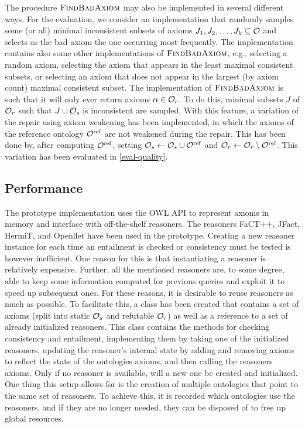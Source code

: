 The procedure $\textsc{FindBadAxiom}$ may also be implemented in several different ways. For the evaluation, we consider an implementation that randomly samples some (or all) minimal inconsistent subsets of axioms $J_1, J_2, \dots, J_k \subseteq \mathcal{O}$ and selects as the bad axiom the one occurring most frequently. The implementation contains also some other implementations of $\textsc{FindBadAxiom}$, e.g., selecting a random axiom, selecting the axiom that appears in the least maximal consistent subsets, or selecting an axiom that does not appear in the largest (by axiom count) maximal consistent subset. The implementation of $\textsc{FindBadAxiom}$ is such that it will only ever return axioms $\alpha \in \mathcal{O}_r$. To do this, minimal subsets $J$ of $\mathcal{O}_r$ such that $J \cup \mathcal{O}_s$ is inconsistent are sampled. With this feature, a variation of the repair using axiom weakening has been implemented, in which the axioms of the reference ontology ${\mathcal{O}^\textnormal{ref}}$ are not weakened during the repair. This has been done by, after computing ${\mathcal{O}^\textnormal{ref}}$, setting $\mathcal{O}_s \gets \mathcal{O}_s \cup {\mathcal{O}^\textnormal{ref}}$ and $\mathcal{O}_r \gets \mathcal{O}_r \setminus {\mathcal{O}^\textnormal{ref}}$. This variation has been evaluated in \cref{eval-quality}.

\subsection{Performance}\label{performance-impl}

The prototype implementation uses the OWL API \cite{horridge2011owl,owlapi} to represent axioms in memory and interface with off-the-shelf reasoners. The reasoners FaCT++, JFact, HermiT, and Openllet have been used in the prototype. Creating a new reasoner instance for each time an entailment is checked or consistency must be tested is however inefficient. One reason for this is that instantiating a reasoner is relatively expensive. Further, all the mentioned reasoners are, to some degree, able to keep some information computed for previous queries and exploit it to speed up subsequent ones. For these reasons, it is desirable to reuse reasoners as much as possible. To facilitate this, a class  has been created that contains a set of axioms (split into static $\mathcal{O}_s$ and refutable $\mathcal{O}_r$) as well as a reference to a set of already initialized reasoners. This class contains the methods for checking consistency and entailment, implementing them by taking one of the initialized reasoners, updating the reasoner's internal state by adding and removing axioms to reflect the state of the ontologies axioms, and then calling the reasoners axioms. Only if no reasoner is available, will a new one be created and initialized. One thing this setup allows for is the creation of multiple ontologies that point to the same set of reasoners. To achieve this, it is recorded which ontologies use the reasoners, and if they are no longer needed, they can be disposed of to free up global resources.

